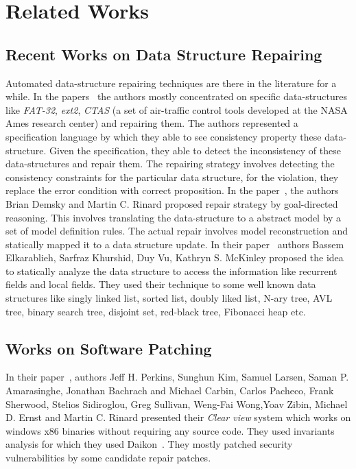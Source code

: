 

\section{Related Works}
\label{sec:relatedWorks}

\subsection{Recent Works on Data Structure Repairing}
\label{subsec:RecWorksDataStructure}

Automated data-structure repairing techniques are there in the literature for a
while. In the papers~\cite{conf/oopsla/DemskyR03, Demsky03automaticdata,
conf/icse/DemskyR05, conf/issre/DemskyR03, conf/issta/DemskyEGMPR06} the authors
mostly concentrated on specific data-structures like \emph{FAT-32}, \emph{ext2},
\emph{CTAS} (a set of air-traffic control tools developed at the NASA Ames
research center) and repairing them. The authors represented a specification
language by which they able to see consistency property these data-structure.
Given the specification, they able to detect the inconsistency of these
data-structures and repair them.
The repairing strategy involves detecting the consistency constraints for the
particular data structure, for the violation, they replace the error condition
with correct proposition. In the paper~\cite{conf/icse/DemskyR05}, the authors
Brian Demsky and Martin C. Rinard proposed repair strategy by goal-directed
reasoning. This involves translating the data-structure to a abstract model by a
set of model definition rules. The actual repair involves model reconstruction
and statically mapped it to a data structure update. In their
paper~\cite{conf/oopsla/2007} authors Bassem Elkarablieh, Sarfraz Khurshid, Duy
Vu, Kathryn S. McKinley proposed the idea to statically analyze the data
structure to access the information like recurrent fields and local fields. They
used their technique to some well known data structures like singly linked list,
sorted list, doubly liked list, N-ary tree, AVL tree, binary search tree,
disjoint set, red-black tree, Fibonacci heap etc.

\subsection{Works on Software Patching}
\label{subsec:RecWorksSoftPatch}

In their paper~\cite{conf/sosp/PerkinsKLABCPSSSWZER09}, authors Jeff H.
Perkins, Sunghun Kim, Samuel Larsen, Saman P. Amarasinghe, Jonathan Bachrach and
Michael Carbin, Carlos Pacheco, Frank Sherwood, Stelios Sidiroglou, Greg
Sullivan, Weng-Fai Wong,Yoav Zibin, Michael D. Ernst and Martin C. Rinard
presented their \emph{Clear view} system which works on windows x86 binaries
without requiring any source code. They used invariants analysis for which they
used Daikon~\cite{journals/scp/ErnstPGMPTX07}. They mostly patched security
vulnerabilities by some candidate repair patches.


